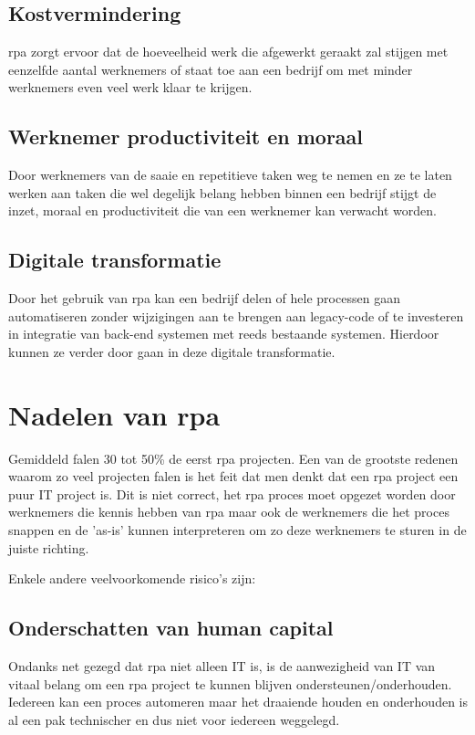 \subsection{Kostvermindering}
\acrshort{rpa} zorgt ervoor dat de hoeveelheid werk die afgewerkt geraakt zal stijgen met eenzelfde aantal werknemers of staat toe aan een bedrijf om met minder werknemers even veel werk klaar te krijgen. \autocite{efficiencyRPA}

\subsection{Werknemer productiviteit en moraal}
Door werknemers van de saaie en repetitieve taken weg te nemen en ze te laten werken aan taken die wel degelijk belang hebben binnen een bedrijf stijgt de inzet, moraal en productiviteit die van een werknemer kan verwacht worden. \autocite{efficiencyRPA}

\subsection{Digitale transformatie}
Door het gebruik van \acrshort{rpa} kan een bedrijf delen of hele processen gaan automatiseren zonder wijzigingen aan te brengen aan legacy-code of te investeren in integratie van back-end systemen met reeds bestaande systemen. Hierdoor kunnen ze verder door gaan in deze digitale transformatie. \autocite{efficiencyRPA}

\section{Nadelen van \acrshort{rpa}}
Gemiddeld falen 30 tot 50\% de eerst \acrshort{rpa} projecten. \autocite{everythingRPA} Een van de grootste redenen waarom zo veel projecten falen is het feit dat men denkt dat een \acrshort{rpa} project een puur IT project is. Dit is niet correct, het \acrshort{rpa} proces moet opgezet worden door werknemers die kennis hebben van \acrshort{rpa} maar ook de werknemers die het proces snappen en de 'as-is' kunnen interpreteren om zo deze werknemers te sturen in de juiste richting.

Enkele andere veelvoorkomende risico's zijn:

\subsection{Onderschatten van human capital}
Ondanks net gezegd dat \acrshort{rpa} niet alleen IT is, is de aanwezigheid van IT van vitaal belang om een \acrshort{rpa} project te kunnen blijven ondersteunen/onderhouden. Iedereen kan een proces automeren maar het draaiende houden en onderhouden is al een pak technischer en dus niet voor iedereen weggelegd. \autocite{everythingRPA}

